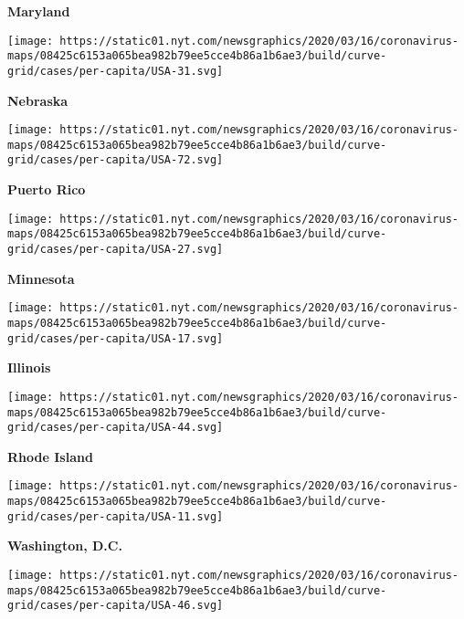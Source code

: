 \textbf{Maryland}

\href{https://www.nytimes.com/interactive/2020/us/nebraska-coronavirus-cases.html}{}

\texttt{[image: https://static01.nyt.com/newsgraphics/2020/03/16/coronavirus-maps/08425c6153a065bea982b79ee5cce4b86a1b6ae3/build/curve-grid/cases/per-capita/USA-31.svg]}

\textbf{Nebraska}

\href{https://www.nytimes.com/interactive/2020/us/puerto-rico-coronavirus-cases.html}{}

\texttt{[image: https://static01.nyt.com/newsgraphics/2020/03/16/coronavirus-maps/08425c6153a065bea982b79ee5cce4b86a1b6ae3/build/curve-grid/cases/per-capita/USA-72.svg]}

\textbf{Puerto Rico}

\href{https://www.nytimes.com/interactive/2020/us/minnesota-coronavirus-cases.html}{}

\texttt{[image: https://static01.nyt.com/newsgraphics/2020/03/16/coronavirus-maps/08425c6153a065bea982b79ee5cce4b86a1b6ae3/build/curve-grid/cases/per-capita/USA-27.svg]}

\textbf{Minnesota}

\href{https://www.nytimes.com/interactive/2020/us/illinois-coronavirus-cases.html}{}

\texttt{[image: https://static01.nyt.com/newsgraphics/2020/03/16/coronavirus-maps/08425c6153a065bea982b79ee5cce4b86a1b6ae3/build/curve-grid/cases/per-capita/USA-17.svg]}

\textbf{Illinois}

\href{https://www.nytimes.com/interactive/2020/us/rhode-island-coronavirus-cases.html}{}

\texttt{[image: https://static01.nyt.com/newsgraphics/2020/03/16/coronavirus-maps/08425c6153a065bea982b79ee5cce4b86a1b6ae3/build/curve-grid/cases/per-capita/USA-44.svg]}

\textbf{Rhode Island}

\href{https://www.nytimes.com/interactive/2020/us/washington-dc-coronavirus-cases.html}{}

\texttt{[image: https://static01.nyt.com/newsgraphics/2020/03/16/coronavirus-maps/08425c6153a065bea982b79ee5cce4b86a1b6ae3/build/curve-grid/cases/per-capita/USA-11.svg]}

\textbf{Washington, D.C.}

\href{https://www.nytimes.com/interactive/2020/us/south-dakota-coronavirus-cases.html}{}

\texttt{[image: https://static01.nyt.com/newsgraphics/2020/03/16/coronavirus-maps/08425c6153a065bea982b79ee5cce4b86a1b6ae3/build/curve-grid/cases/per-capita/USA-46.svg]}

